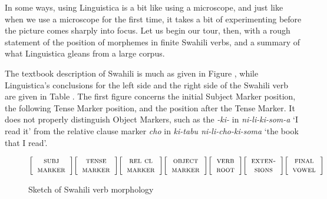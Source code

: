 \documentclass[output=paper,colorlinks,citecolor=brown,
]{langscibook}
\begin{document}
In some ways, using Linguistica is a bit like using a microscope, and just like when we use a microscope for the first time, it takes a bit of experimenting before the picture comes sharply into focus. Let us begin our tour, then, with a rough statement of the position of morphemes in finite Swahili verbs, and a summary of what Linguistica gleans from a large corpus. 

The textbook description of Swahili is much as given in Figure , while Linguistica's conclusions for the left side and the right side of the Swahili verb are given in Table . The first figure concerns the initial Subject Marker position, the following Tense Marker position, and the position after the Tense Marker. It does not properly distinguish Object Markers, such as the \textit{-ki-} in \textit{ni-li-ki-som-a} `I read it'  from the relative clause marker  \textit{cho} in \textit{ki-tabu ni-li-cho-ki-soma} `the book that I read'.     

  
\begin{figure}
 
$\bigg[
\begin{tabular}{c} 
\textsc{subj}\\
\textsc{marker}\\
\end{tabular}
\bigg] 
\bigg[
\begin{tabular}{c} 
\textsc{tense}\\
\textsc{marker}\\
\end{tabular}
\bigg] 
\bigg[
\begin{tabular}{c} 
\textsc{rel cl}\\
\textsc{marker}\\
\end{tabular}
\bigg] 
\bigg[
\begin{tabular}{c} 
\textsc{object}\\
\textsc{marker}\\
\end{tabular}
\bigg] 
\bigg[
\begin{tabular}{c}
\textsc{verb}\\ 
\textsc{root}\\
\end{tabular}
\bigg] 
\bigg[
\begin{tabular}{c} 
\textsc{exten-}\\
\textsc{sions}
\end{tabular}
\bigg] 
\bigg[
\begin{tabular}{c} 
\textsc{final}\\
\textsc{vowel}
\end{tabular}
\bigg] 
$
\caption{Sketch of Swahili verb morphology}
\label{sketch}
\end{figure}
\end{document}
